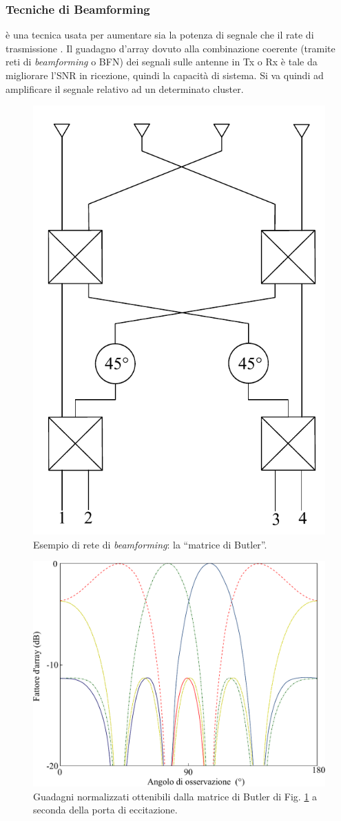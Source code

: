 \documentclass[technote]{IEEEtran}
\begin{document}
\subsubsection{Tecniche di Beamforming} è una tecnica usata per aumentare sia la potenza di segnale che il rate di trasmissione \cite{Baumgartner}. Il guadagno d'array \cite{Balanis} dovuto alla combinazione coerente (tramite reti di \textit{beamforming} o BFN) dei segnali sulle antenne in Tx o Rx è tale da migliorare l'SNR in ricezione, quindi la capacità di sistema. %
Si va quindi ad amplificare il segnale relativo ad un determinato {cluster}.
\begin{figure}[!ht]
\centering
\includegraphics[width=0.6\columnwidth]{figure10}
\caption{Esempio di rete di \textit{beamforming}: la ``matrice di Butler''.}
\label{fig:10}
\end{figure}

\begin{figure}[!ht]
\centering
\includegraphics[width=0.95\columnwidth]{figure11}
\caption{Guadagni normalizzati ottenibili dalla matrice di Butler di Fig. \ref{fig:10} a seconda della porta di eccitazione.}
\label{fig:11}
\end{figure}
\end{document}
